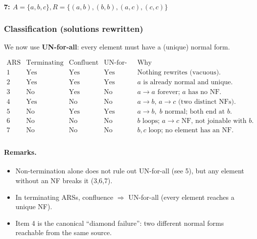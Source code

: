 \documentclass{article}
\theoremstyle{theorem}
\theoremstyle{definition}
\theoremstyle{remark}
\begin{document}

\textbf{7: $A=\{a,b,c\}, R=\{(a,b),(b,b),(a,c),(c,c)\}$}

\subsubsection*{Classification (solutions rewritten)}
We now use \textbf{UN-for-all}: every element must have a (unique) normal form.

\[
\begin{array}{c|c|c|c|l}
\text{ARS} & \text{Terminating} & \text{Confluent} & \text{UN-for-all} & \text{Why} \\\hline
1 & \text{Yes} & \text{Yes} & \text{Yes} & \text{Nothing rewrites (vacuous).} \\
2 & \text{Yes} & \text{Yes} & \text{Yes} & a \text{ is already normal and unique.} \\
3 & \text{No} & \text{Yes} & \text{No}  & a \to a \text{ forever; } a \text{ has no NF.} \\
4 & \text{Yes} & \text{No}  & \text{No}  & a\to b,\,a\to c \text{ (two distinct NFs).} \\
5 & \text{No} & \text{Yes} & \text{Yes} & a\to b,\; b \text{ normal; both end at } b. \\
6 & \text{No} & \text{No}  & \text{No}  & b \text{ loops; } a\to c \text{ NF, not joinable with } b. \\
7 & \text{No} & \text{No}  & \text{No}  & b,c \text{ loop; no element has an NF.} \\
\end{array}
\]

\paragraph{Remarks.}
\begin{itemize}
  \item Non-termination alone does not rule out UN-for-all (see 5), but any element without an NF breaks it (3,6,7).
  \item In terminating ARSs, confluence $\Rightarrow$ UN-for-all (every element reaches a unique NF).
  \item Item 4 is the canonical “diamond failure”: two different normal forms reachable from the same source.
\end{itemize}
\end{document}

